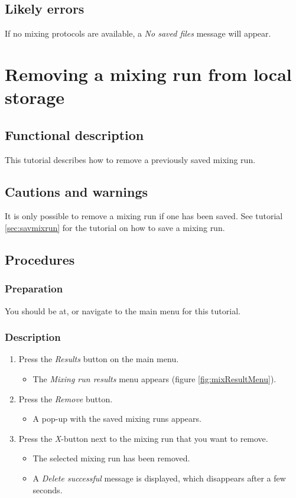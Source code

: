 \subsection{Likely errors}
If no mixing protocols are available, a \emph{No saved files} message will appear.

\section{Removing a mixing run from local storage}
\label{sec:remmixrun}

\subsection{Functional description}
This tutorial describes how to remove a previously saved mixing run.

\subsection{Cautions and warnings}
It is only possible to remove a mixing run if one has been saved. See tutorial \ref{sec:savmixrun} for the tutorial on how to save a mixing run.

\subsection{Procedures}

\subsubsection{Preparation}
You should be at, or navigate to the main menu for this tutorial.

\subsubsection{Description}
\begin{enumerate}
	\item Press the \emph{Results} button on the main menu.
		\begin{itemize}
           \item  The \emph{Mixing run results} menu appears (figure \ref{fig:mixResultMenu}).
		\end{itemize}
	\item Press the \emph{Remove} button.
		\begin{itemize}
			\item A pop-up with the saved mixing runs appears.
		\end{itemize}
	\item Press the \emph{X}-button next to the mixing run that you want to remove.
		\begin{itemize}
			\item The selected mixing run has been removed.
			\item A \emph{Delete successful} message is displayed, which disappears after a few seconds.
		\end{itemize}
\end{enumerate}

